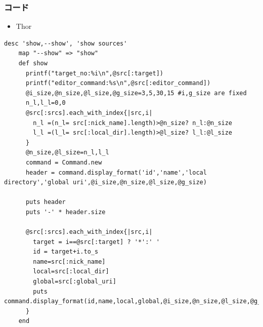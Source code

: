 \subsubsection{コード}
\begin{itemize}
\item Thor
\end{itemize}\begin{lstlisting}[style=customRuby]
    desc 'show,--show', 'show sources'
    map "--show" => "show"
    def show
      printf("target_no:%i\n",@src[:target])
      printf("editor_command:%s\n",@src[:editor_command])
      @i_size,@n_size,@l_size,@g_size=3,5,30,15 #i,g_size are fixed             
      n_l,l_l=0,0
      @src[:srcs].each_with_index{|src,i|
        n_l =(n_l= src[:nick_name].length)>@n_size? n_l:@n_size
        l_l =(l_l= src[:local_dir].length)>@l_size? l_l:@l_size
      }
      @n_size,@l_size=n_l,l_l
      command = Command.new
      header = command.display_format('id','name','local directory','global uri',@i_size,@n_size,@l_size,@g_size)

      puts header
      puts '-' * header.size

      @src[:srcs].each_with_index{|src,i|
        target = i==@src[:target] ? '*':' '
        id = target+i.to_s
        name=src[:nick_name]
        local=src[:local_dir]
        global=src[:global_uri]
        puts command.display_format(id,name,local,global,@i_size,@n_size,@l_size,@g_size)
      }
    end
\end{lstlisting}
